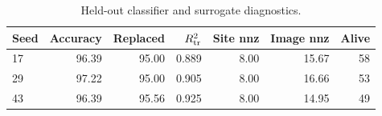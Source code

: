 \begin{table}[tbp]
    \centering
    \small
    \caption{Held-out classifier and surrogate diagnostics.}
    \label{tab:reconstruction}
    \begin{tabular}{lrrrrrr}
        \toprule
        Seed & Accuracy & Replaced & $R^{2}_{\rm tr}$ & Site nnz & Image nnz &
        Alive \\
        \midrule
        17   & 96.39    & 95.00    & 0.889            & 8.00     & 15.67     &
        58    \\
        29   & 97.22    & 95.00    & 0.905            & 8.00     & 16.66     &
        53    \\
        43   & 96.39    & 95.56    & 0.925            & 8.00     & 14.95     &
        49    \\
        \bottomrule
    \end{tabular}
\end{table}

